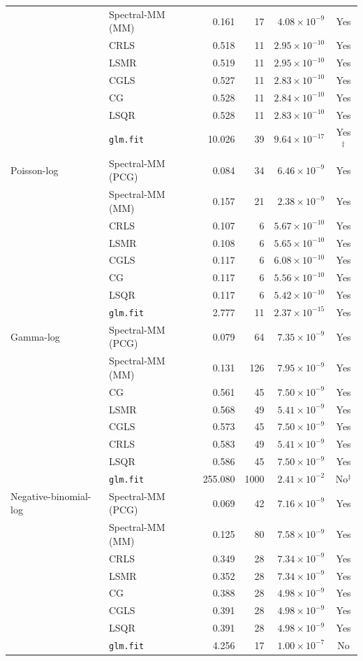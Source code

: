 \documentclass[10pt,a4paper]{article}
\begin{document}
\begin{longtable}{llrrrc}
 & Spectral-MM (MM) & 0.161 & 17 & $4.08\times10^{-9}$ & Yes \\
 & CRLS & 0.518 & 11 & $2.95\times10^{-10}$ & Yes \\
 & LSMR & 0.519 & 11 & $2.95\times10^{-10}$ & Yes \\
 & CGLS & 0.527 & 11 & $2.83\times10^{-10}$ & Yes \\
 & CG & 0.528 & 11 & $2.84\times10^{-10}$ & Yes \\
 & LSQR & 0.528 & 11 & $2.83\times10^{-10}$ & Yes \\
 & \texttt{glm.fit} & 10.026 & 39 & $9.64\times10^{-17}$ & Yes$^{\ddagger}$ \\
\midrule
Poisson-log & Spectral-MM (PCG) & 0.084 & 34 & $6.46\times10^{-9}$ & Yes \\
 & Spectral-MM (MM) & 0.157 & 21 & $2.38\times10^{-9}$ & Yes \\
 & CRLS & 0.107 & 6 & $5.67\times10^{-10}$ & Yes \\
 & LSMR & 0.108 & 6 & $5.65\times10^{-10}$ & Yes \\
 & CGLS & 0.117 & 6 & $6.08\times10^{-10}$ & Yes \\
 & CG & 0.117 & 6 & $5.56\times10^{-10}$ & Yes \\
 & LSQR & 0.117 & 6 & $5.42\times10^{-10}$ & Yes \\
 & \texttt{glm.fit} & 2.777 & 11 & $2.37\times10^{-15}$ & Yes \\
\midrule
Gamma-log & Spectral-MM (PCG) & 0.079 & 64 & $7.35\times10^{-9}$ & Yes \\
 & Spectral-MM (MM) & 0.131 & 126 & $7.95\times10^{-9}$ & Yes \\
 & CG & 0.561 & 45 & $7.50\times10^{-9}$ & Yes \\
 & LSMR & 0.568 & 49 & $5.41\times10^{-9}$ & Yes \\
 & CGLS & 0.573 & 45 & $7.50\times10^{-9}$ & Yes \\
 & CRLS & 0.583 & 49 & $5.41\times10^{-9}$ & Yes \\
 & LSQR & 0.586 & 45 & $7.50\times10^{-9}$ & Yes \\
 & \texttt{glm.fit} & 255.080 & 1000 & $2.41\times10^{-2}$ & No$^{\ddagger}$ \\
\midrule
Negative-binomial-log & Spectral-MM (PCG) & 0.069 & 42 & $7.16\times10^{-9}$ & Yes \\
 & Spectral-MM (MM) & 0.125 & 80 & $7.58\times10^{-9}$ & Yes \\
 & CRLS & 0.349 & 28 & $7.34\times10^{-9}$ & Yes \\
 & LSMR & 0.352 & 28 & $7.34\times10^{-9}$ & Yes \\
 & CG & 0.388 & 28 & $4.98\times10^{-9}$ & Yes \\
 & CGLS & 0.391 & 28 & $4.98\times10^{-9}$ & Yes \\
 & LSQR & 0.391 & 28 & $4.98\times10^{-9}$ & Yes \\
 & \texttt{glm.fit} & 4.256 & 17 & $1.00\times10^{-7}$ & No \\
\end{longtable}
\end{document}
